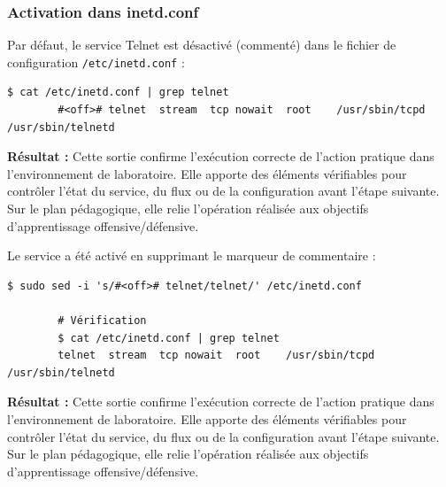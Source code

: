 \documentclass[12pt,a4paper,openany]{report}
\begin{document}
	\subsubsection{Activation dans inetd.conf}
	Par défaut, le service Telnet est désactivé (commenté) dans le fichier de configuration \texttt{/etc/inetd.conf} :
	
	\begin{lstlisting}[caption=Configuration par défaut (désactivée)]
		$ cat /etc/inetd.conf | grep telnet
		#<off># telnet	stream	tcp	nowait	root	/usr/sbin/tcpd	/usr/sbin/telnetd
	\end{lstlisting}
	
	\textbf{Résultat :} Cette sortie confirme l'exécution correcte de l'action pratique dans l'environnement de laboratoire. Elle apporte des éléments vérifiables pour contrôler l'état du service, du flux ou de la configuration avant l'étape suivante. Sur le plan pédagogique, elle relie l'opération réalisée aux objectifs d'apprentissage offensive/défensive.
	
	
	Le service a été activé en supprimant le marqueur de commentaire :
	
	\begin{lstlisting}[caption=Activation du service Telnet]
		$ sudo sed -i 's/#<off># telnet/telnet/' /etc/inetd.conf
		
		# Vérification
		$ cat /etc/inetd.conf | grep telnet
		telnet	stream	tcp	nowait	root	/usr/sbin/tcpd	/usr/sbin/telnetd
	\end{lstlisting}
	
	\textbf{Résultat :} Cette sortie confirme l'exécution correcte de l'action pratique dans l'environnement de laboratoire. Elle apporte des éléments vérifiables pour contrôler l'état du service, du flux ou de la configuration avant l'étape suivante. Sur le plan pédagogique, elle relie l'opération réalisée aux objectifs d'apprentissage offensive/défensive.
	
\end{document}
